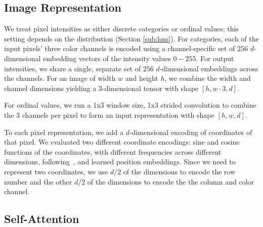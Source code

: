 \documentclass{article}
\newcommand{\height}{h}
\newcommand{\width}{w}
\newcommand{\modeldim}{d}
\DeclareRobustCommand{\sidenote}[1]{\marginpar{
                                    \RaggedRight
                                    \textcolor{red}{\textsf{#1}}}}
\begin{document}
\subsection{Image Representation}\label{sec:image-rep}
We treat pixel intensities as either discrete categories or ordinal values; this setting depends on the distribution (Section \ref{sub:loss}).
For categories, each of the input pixels' three color channels is encoded using a channel-specific set of $256$ $\modeldim$-dimensional embedding vectors of the intensity values $0-255$. For output intensities, we share a single, separate set of $256$ $\modeldim$-dimensional embeddings across the channels.
For an image of width $w$ and height $h$, we combine the width and channel dimensions yielding a 3-dimensional tensor with shape $[\height, \width \cdot 3, \modeldim]$.

For ordinal values, we run a 1x3 window size, 1x3 strided convolution to combine the $3$ channels per pixel to form an input representation with shape $[\height, \width, \modeldim]$.

To each pixel representation, we add a $\modeldim$-dimensional encoding of coordinates of that pixel. We evaluated two different coordinate encodings: sine and cosine functions of the coordinates, with different frequencies across different dimensions, following~\cite{aiayn}, and learned position embeddings. Since we need to represent two coordinates, we use $\modeldim/2$ of the dimensions to encode the row number and the other $\modeldim/2$ of the dimensions to encode the the column and color channel.

\iffalse

as follows:

\sidenote{trandustin: change to learnable embeddings?}
\begin{align*}
    PE_{(pos,2i)} = sin(pos / 10000^{2i/\modeldim}), \\
    PE_{(pos,2i+1)} = cos(pos / 10000^{2i/\modeldim}),
\end{align*}

where $pos$ and $i$ are the position and dimension respectively. Each dimension of the positional encoding corresponds to a sinusoid and the wavelengths form a geometric progression from $2\pi$ to $10000 \cdot 2\pi$.  
\fi





\subsection{Self-Attention}
\end{document}
